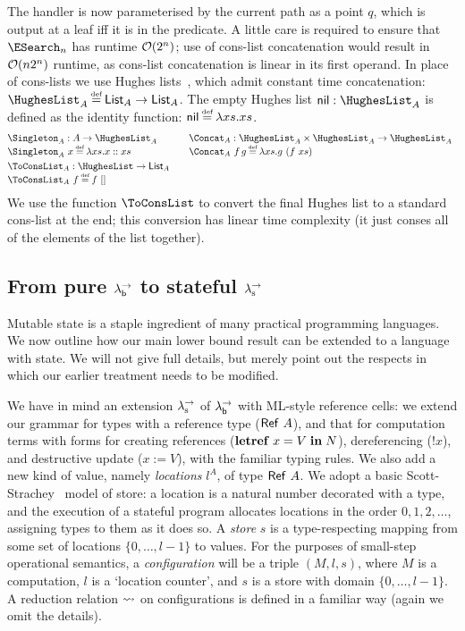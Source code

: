 \documentclass[12pt,phd,lfcs,twoside,openright,logo,leftchapter,normalheadings]{infthesis}
\theoremstyle{plain}
\theoremstyle{definition}
\begin{document}
%
The handler is now parameterised by the current path as a point $q$,
which is output at a leaf iff it is in the predicate.
%
A little care is required to ensure that $\ESearch_n$ has runtime
$\mathcal{O}(2^n)$; \naive use of cons-list concatenation would result in
$\mathcal{O}(n2^n)$ runtime, as cons-list concatenation is linear in its
first operand. In place of cons-lists we use Hughes
lists~\citep{Hughes86}, which admit constant time concatenation:
%
$\HughesList_A \defas \List_A \to \List_A$. The empty Hughes list
$\dec{nil} : \HughesList_A$ is defined as the identity function:
$\dec{nil} \defas \lambda xs. xs$.
%
{
\[
  \ba{@{}l@{\qquad}l}
  \bl
    \Singleton_A : A \to \HughesList_A\\
    \Singleton_A~x \defas \lambda xs. x \cons xs
  \el &
  \bl
     \Concat_A : \HughesList_A \times \HughesList_A \to \HughesList_A\\
     \Concat_A~f\,g \defas \lambda xs. g~(f~xs)
  \el \smallskip\\
   \bl
      \ToConsList_A : \HughesList \to \List_A\\
      \ToConsList_A~f \defas f~\nil
   \el &
   \ea
\]}%
We use the function $\ToConsList$ to convert the final Hughes list to
a standard cons-list at the end; this conversion has linear time
complexity (it just conses all of the elements of the list together).


\subsection{From pure $\lambda^\rightarrow_{\mathsf{b}}$ to stateful $\lambda^\rightarrow_{\textrm{\normalfont s}}$}
\label{sec:mutable-state}

Mutable state is a staple ingredient of many practical programming
languages.  We now outline how our main lower bound result can be
extended to a language with state.  We will not give full details, but
merely point out the respects in which our earlier treatment needs to
be modified.

We have in mind an extension $\lambda^\rightarrow_{\textrm{\normalfont s}}$ of $\lambda^\rightarrow_{\mathsf{b}}$ with ML-style
reference cells: we extend our grammar for types with a reference type
($\mathsf{Ref}~A$), and that for computation terms with forms for creating
references ($\mathbf{letref}\; x = V\; \mathbf{in}\; N$), dereferencing ($!x$),
and destructive update ($x := V$), with the familiar typing rules.  We
also add a new kind of value, namely \emph{locations} $l^A$, of type
$\mathsf{Ref}~A$. We adopt a basic Scott-Strachey~\citeyearpar{ScottS71} model
of store: a location is a natural number decorated with a type, and
the execution of a stateful program allocates locations in the order
$0,1,2,\ldots$, assigning types to them as it does so. A \emph{store}
$s$ is a type-respecting mapping from some set of locations $\{
0,\ldots,l-1 \}$ to values.  For the purposes of small-step
operational semantics, a \emph{configuration} will be a triple
$(M,l,s)$, where $M$ is a computation, $l$ is a `location counter',
and $s$ is a store with domain $\{ 0,\ldots,l-1 \}$. A reduction
relation $\leadsto$ on configurations is defined in a familiar way
(again we omit the details).
\end{document}
